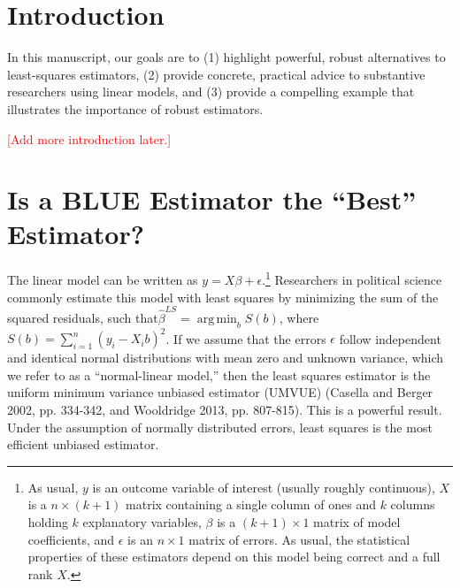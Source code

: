 \documentclass[12pt]{article}
\DeclareMathOperator*{\argmin}{arg\,min}
\newcommand{\ctk}[1]{\textcolor{red}{#1}}
\begin{document}


\thispagestyle{empty}

\newpage
\doublespace

\section*{Introduction}

In this manuscript, our goals are to (1) highlight powerful, robust alternatives to least-squares estimators, (2) provide concrete, practical advice to substantive researchers using linear models, and (3) provide a compelling example that illustrates the importance of robust estimators.

\ctk{[Add more introduction later.]}

\section*{Is a BLUE Estimator the ``Best'' Estimator?}

The linear model can be written as $y = X\beta + \epsilon$.\footnote{As usual, $y$ is an outcome variable of interest (usually roughly continuous), $X$ is a $n \times (k + 1)$ matrix containing a single column of ones and $k$ columns holding $k$ explanatory variables, $\beta$ is a $(k + 1) \times 1$ matrix of model coefficients, and $\epsilon$ is an $n \times 1$ matrix of errors. As usual, the statistical properties of these estimators depend on this model being correct and a full rank $X$.} 
Researchers in political science commonly estimate this model with least squares by minimizing the sum of the squared residuals, such that$\hat{\beta}^{LS} = \argmin_b S(b)$, where $S(b) = \sum_{i = 1}^n(y_i - X_ib)^2$. 
If we assume that the errors $\epsilon$ follow independent and identical normal distributions with mean zero and unknown variance, which we refer to as a ``normal-linear model,'' then the least squares estimator is the uniform minimum variance unbiased estimator (UMVUE) (Casella and Berger 2002, pp. 334-342, and Wooldridge 2013, pp. 807-815).
This is a powerful result. 
Under the assumption of normally distributed errors, least squares is the most efficient unbiased estimator.
\end{document}
